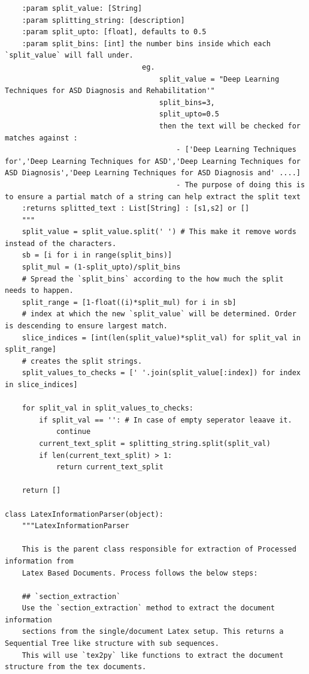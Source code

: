 \begin{lstlisting}
    :param split_value: [String]
    :param splitting_string: [description]
    :param split_upto: [float], defaults to 0.5 
    :param split_bins: [int] the number bins inside which each `split_value` will fall under. 
                                eg. 
                                    split_value = "Deep Learning Techniques for ASD Diagnosis and Rehabilitation'"
                                    split_bins=3,
                                    split_upto=0.5
                                    then the text will be checked for matches against : 
                                        - ['Deep Learning Techniques for','Deep Learning Techniques for ASD','Deep Learning Techniques for ASD Diagnosis','Deep Learning Techniques for ASD Diagnosis and' ....]
                                        - The purpose of doing this is to ensure a partial match of a string can help extract the split text 
    :returns splitted_text : List[String] : [s1,s2] or []
    """
    split_value = split_value.split(' ') # This make it remove words instead of the characters. 
    sb = [i for i in range(split_bins)]
    split_mul = (1-split_upto)/split_bins
    # Spread the `split_bins` according to the how much the split needs to happen. 
    split_range = [1-float((i)*split_mul) for i in sb]
    # index at which the new `split_value` will be determined. Order is descending to ensure largest match. 
    slice_indices = [int(len(split_value)*split_val) for split_val in split_range] 
    # creates the split strings.     
    split_values_to_checks = [' '.join(split_value[:index]) for index in slice_indices] 
    
    for split_val in split_values_to_checks:
        if split_val == '': # In case of empty seperator leaave it. 
            continue
        current_text_split = splitting_string.split(split_val)
        if len(current_text_split) > 1:
            return current_text_split
    
    return []

class LatexInformationParser(object):
    """LatexInformationParser 

    This is the parent class responsible for extraction of Processed information from 
    Latex Based Documents. Process follows the below steps:

    ## `section_extraction`
    Use the `section_extraction` method to extract the document information
    sections from the single/document Latex setup. This returns a Sequential Tree like structure with sub sequences. 
    This will use `tex2py` like functions to extract the document structure from the tex documents. 
    

\end{lstlisting}

